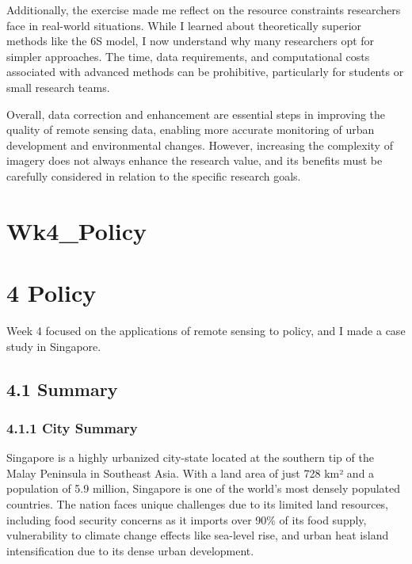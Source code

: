 \documentclass[
  letterpaper,
  DIV=11,
  numbers=noendperiod]{scrreprt}
\begin{document}
Additionally, the exercise made me reflect on the resource constraints
researchers face in real-world situations. While I learned about
theoretically superior methods like the 6S model, I now understand why
many researchers opt for simpler approaches. The time, data
requirements, and computational costs associated with advanced methods
can be prohibitive, particularly for students or small research teams.

Overall, data correction and enhancement are essential steps in
improving the quality of remote sensing data, enabling more accurate
monitoring of urban development and environmental changes. However,
increasing the complexity of imagery does not always enhance the
research value, and its benefits must be carefully considered in
relation to the specific research goals.


\chapter{Wk4\_Policy}\label{wk4_policy}


\chapter{4 Policy}\label{policy}

Week 4 focused on the applications of remote sensing to policy, and I
made a case study in Singapore.

\section{4.1 Summary}\label{summary-2}

\subsection{4.1.1 City Summary}\label{city-summary}

Singapore is a highly urbanized city-state located at the southern tip
of the Malay Peninsula in Southeast Asia. With a land area of just 728
km² and a population of 5.9 million, Singapore is one of the world's
most densely populated countries. The nation faces unique challenges due
to its limited land resources, including food security concerns as it
imports over 90\% of its food supply, vulnerability to climate change
effects like sea-level rise, and urban heat island intensification due
to its dense urban development.
\end{document}
